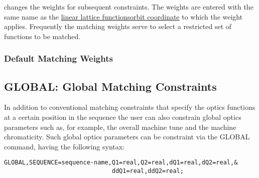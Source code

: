 changes the weights for subsequent constraints.
The weights are entered with the same name as the
\href{../Introduction/tables.html#linear}{linear lattice functions}\href{../Introduction/closed_orbit.html}{orbit coordinate}
to which the weight applies.
Frequently the matching weights serve to select a restricted
set of functions to be matched.

\subsubsection{Default Matching Weights}


\subsection{GLOBAL: Global Matching Constraints}

In addition to conventional matching constraints that specify the optics 
functions at a certain position in the sequence the user can also constrain 
global optics parameters such as, for example, 
the overall machine tune and the machine chromaticity.
Such global optics parameters can be constraint via the 
GLOBAL command, having
the following syntax:

\begin{verbatim}
GLOBAL,SEQUENCE=sequence-name,Q1=real,Q2=real,dQ1=real,dQ2=real,&
                              ddQ1=real,ddQ2=real;
\end{verbatim}

